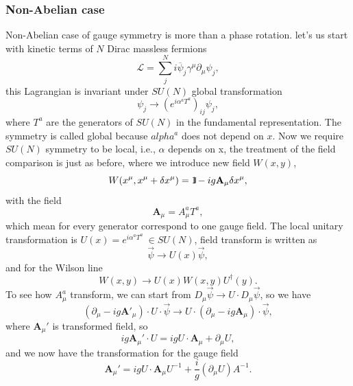 \documentclass{report}
\numberwithin{equation}{section}
\begin{document}
\subsubsection{Non-Abelian case}
Non-Abelian case of gauge symmetry is more than a phase rotation. let's us start with kinetic terms of $N$ Dirac massless fermions
\begin{equation}
\mathcal{L}=\sum^N_j i\overline{\psi}_j \gamma^\mu \partial_\mu \psi_j,
\end{equation}
this Lagrangian is invariant under $SU(N)$ global transformation
\begin{equation}
\psi_j\rightarrow (e^{i\alpha^a T^a})_{ij} \psi_j,
\end{equation}
where $T^a$ are the generators of $SU(N)$ in the fundamental representation. The symmetry is called global because $alpha^a$ does not depend on $x$. Now we require $SU(N)$ symmetry to be local, i.e., $\alpha$ depends on x, the treatment of the field comparison is just as before, where we introduce new field $W(x,y)$,
\begin{equation}
W(x^\mu,x^\mu+\delta x^\mu)=\normalfont\hbox{1\kern-0.15em \vrule width .8pt depth-.5pt}-ig \textbf{A}_\mu \delta x^\mu,
\end{equation}
with the field
\begin{equation}
\textbf{A}_\mu= A_\mu^a T^a,
\end{equation}
which mean for every generator correspond to one gauge field.
The local unitary transformation is $U(x)=e^{i\alpha^a T^a}\ \in SU(N)$, field transform is written as
\begin{equation}
\vec{\psi}\rightarrow U(x) \vec{\psi},
\end{equation}
and for the Wilson line
\begin{equation}
 W(x,y)\rightarrow U(x) W(x,y)U^\dagger (y).
\end{equation}
To see how $A_\mu^a$ transform, we can start from $D_\mu \vec{\psi}\rightarrow U \cdot D_\mu \vec{\psi}$, so we have 
\begin{equation}
(\partial_\mu-ig\textbf{A}'_\mu)\cdot U \cdot \vec{\psi}\rightarrow U\cdot (\partial_\mu-ig\textbf{A}_\mu)\cdot \vec{\psi},
\end{equation}
where $\textbf{A}_\mu'$ is transformed field, so
\begin{equation}
ig\textbf{A}_\mu'\cdot U=ig U\cdot \textbf{A}_\mu+\partial_\mu U,
\end{equation}
and we now have the transformation for the gauge field
\begin{equation}
\textbf{A}_\mu'=ig U\cdot \textbf{A}_\mu U^{-1}+\frac{i}{g} (\partial_\mu U) A^{-1}.
\end{equation}
\end{document}
